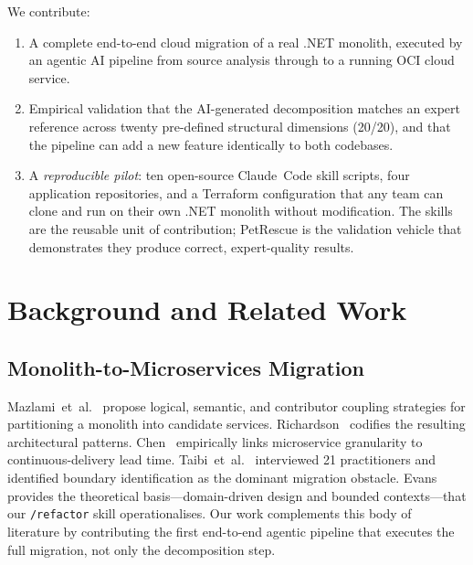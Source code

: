 \documentclass[10pt,journal,compsoc]{IEEEtran}
\begin{document}
We contribute:
\begin{enumerate}
  \item A complete end-to-end cloud migration of a real .NET monolith,
        executed by an agentic AI pipeline from source analysis through
        to a running OCI cloud service.
  \item Empirical validation that the AI-generated decomposition matches
        an expert reference across twenty pre-defined structural
        dimensions (20/20), and that the pipeline can add a new feature
        identically to both codebases.
  \item A \emph{reproducible pilot}: ten open-source Claude~Code skill
        scripts, four application repositories, and a Terraform
        configuration that any team can clone and run on their own
        .NET monolith without modification.  The skills are the
        reusable unit of contribution; PetRescue is the validation
        vehicle that demonstrates they produce correct, expert-quality
        results.
\end{enumerate}

\section{Background and Related Work}
\label{sec:background}

\subsection{Monolith-to-Microservices Migration}
Mazlami~et~al.~\cite{mazlami2017extraction} propose logical, semantic,
and contributor coupling strategies for partitioning a monolith into
candidate services.  Richardson~\cite{richardson2018patterns} codifies
the resulting architectural patterns.  Chen~\cite{chen2018devops}
empirically links microservice granularity to continuous-delivery lead
time.  Taibi~et~al.~\cite{taibi2017processes} interviewed 21
practitioners and identified boundary identification as the dominant
migration obstacle.  Evans~\cite{evans2003ddd} provides the theoretical
basis—domain-driven design and bounded contexts—that our
\texttt{/refactor} skill operationalises.  Our work complements this
body of literature by contributing the first end-to-end agentic pipeline
that executes the full migration, not only the decomposition step.
\end{document}
